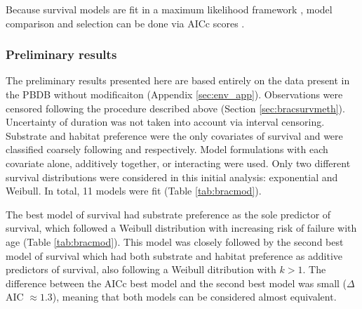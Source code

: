 \documentclass[12pt,letterpaper]{article}
\begin{document}
Because survival models are fit in a maximum likelihood framework \citep{Kleinbaum2005}, model comparison and selection can be done via AICc scores \citep{Hurvich1989,Burnham2002a}.


\subsubsection{Preliminary results} \label{sec:bracsurvres}
The preliminary results presented here are based entirely on the data present in the PBDB without modificaiton (Appendix \ref{sec:env_app}). Observations were censored following the procedure described above (Section \ref{sec:bracsurvmeth}). Uncertainty of duration was not taken into account via interval censoring. Substrate and habitat preference were the only covariates of survival and were classified coarsely following \citet{Foote2006} and \citet{Kiessling2007} respectively. Model formulations with each covariate alone, additively together, or interacting were used. Only two different survival distributions were considered in this initial analysis: exponential and Weibull. In total, 11 models were fit (Table \ref{tab:bracmod}). 

The best model of survival had substrate preference as the sole predictor of survival, which followed a Weibull distribution with increasing risk of failure with age (Table \ref{tab:bracmod}). This model was closely followed by the second best model of survival which had both substrate and habitat preference as additive predictors of survival, also following a Weibull ditribution with \(k > 1\). The difference between the AICc best model and the second best model was small (\(\Delta\) AIC \(\approx 1.3\)), meaning that both models can be considered almost equivalent. 
\end{document}

